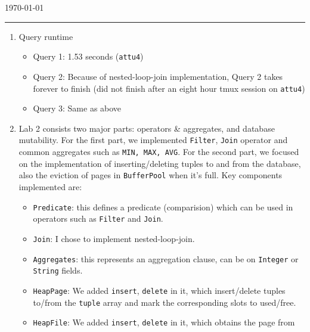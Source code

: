 \documentclass[10pt]{myland}
\begin{document}
\begin{center}
	{\Large {}} \\
	\vspace{.05in}
    \quad{}\\
	\vspace{.05in}
    \today \\
\end{center}
\vspace{.15in} \hrule \vspace{0.5em}%


\begin{enumerate}[label=\textbf{\arabic*.}, listparindent=0.0em, itemsep=1em]
    \item Query runtime
        \begin{itemize}
            \item Query 1: 1.53 seconds (\texttt{attu4})
            \item Query 2: Because of nested-loop-join implementation, Query 2 takes forever to finish (did not finish
                after an eight hour tmux session on \texttt{attu4})
            \item Query 3: Same as above
        \end{itemize}
	\item
	Lab 2 consists two major parts: operators \& aggregates, and database mutability. For the first part, we implemented
    \texttt{Filter}, \texttt{Join} operator and common aggregates such as \texttt{MIN, MAX, AVG}. For the second part,
    we focused on the implementation of inserting/deleting tuples to and from the database, also the eviction of pages
    in \texttt{BufferPool} when it's full. Key components implemented are:
	\begin{itemize}
        \item \texttt{Predicate}: this defines a predicate (comparision) which can be used in operators such as
            \texttt{Filter} and \texttt{Join}.
		\item \texttt{Join}: I chose to implement nested-loop-join.
		\item \texttt{Aggregates}: this represents an aggregation clause, can be on \texttt{Integer} or \texttt{String}
            fields.
		\item \texttt{HeapPage}: We added \texttt{insert}, \texttt{delete} in it, which insert/delete tuples to/from the
            \texttt{tuple} array and mark the corresponding slots to used/free.
        \item \texttt{HeapFile}: We added \texttt{insert}, \texttt{delete} in it, which obtains the page from

\end{itemize}
\end{enumerate}
\end{document}
